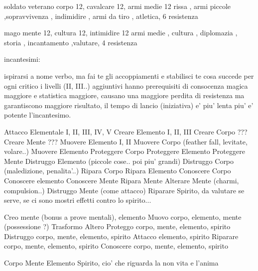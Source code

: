 \documentclass[12pt,a4paper,twoside,openany]{book}
\begin{document}
soldato veterano corpo 12, cavalcare 12, armi medie 12
rissa , armi piccole  ,sopravvivenza , indimidire , armi da tiro , atletica,  6 resistenza

mago mente 12, cultura 12, intimidire 12
armi medie , cultura , diplomazia , storia , incantamento ,valutare,  4 resistenza


incantesimi:

ispirarsi a nome verbo, ma fai te gli accoppiamenti e stabilisci te cosa succede per ogni critico 
i livelli (II, III..) aggiuntivi hanno prerequisiti di consocenza magica maggiore e statistica maggiore, causano una maggiore perdita di resistenza ma garantiscono maggiore risultato, il tempo di lancio (iniziativa) e' piu' lenta piu' e' potente l'incantesimo.

Attacco Elementale I, II, III, IV, V
Creare Elemento I, II, III
Creare Corpo  ???
Creare Mente  ???
Muovere Elemento I, II
Muovere Corpo (feather fall, levitate, volare..)
Muovere Elemento
Proteggere Corpo
Proteggere Elemento 
Proteggere Mente
Distruggo Elemento (piccole cose.. poi piu' grandi)
Distruggo Corpo (maledizione, penalita'..)
Ripara Corpo
Ripara Elemento
Conoscere Corpo
Conoscere elemento
Conoscere Mente
Ripara Mente
Alterare Mente (charmi, compulsion..)
Distruggo Mente (come attacco)
Riparare Spirito, da valutare se serve, se ci sono mostri effetti contro lo spirito...


Creo		mente (bonus a prove mentali), elemento
Muovo		corpo, elemento, mente (possessione ?)
Trasformo	
Altero
Proteggo	corpo, mente, elemento, spirito
Distruggo	corpo, mente, elemento, spirito
Attacco		elemento, spirito
Riparare	corpo, mente, elemento, spirito
Conoscere	corpo, mente, elemento, spirito

Corpo
Mente
Elemento
Spirito, cio' che riguarda la non vita e l'anima
\end{document}
